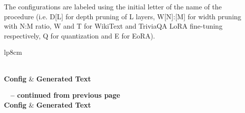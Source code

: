 The configurations are labeled using the initial letter of the name of the procedure (i.e. D[L] for depth pruning of L layers, W[N]:[M] for width pruning with N:M ratio, W and T for WikiText and TriviaQA LoRA fine-tuning respectively, Q for quantization and E for EoRA).
{\footnotesize
\begin{longtable}{lp{8cm}}
\caption[Text Generation Examples]{Sample answers generated by selected model configurations} \label{tab:generated_answers} \\
\hline
\textbf{Config} & \textbf{Generated Text} \\
\hline
\endfirsthead

%
{{\bfseries \tablename\ \thetable{} -- continued from previous page}} \\
\hline
\textbf{Config} & \textbf{Generated Text} \\
\hline
\endhead

\hline {} \\
\endfoot


\end{longtable}}
